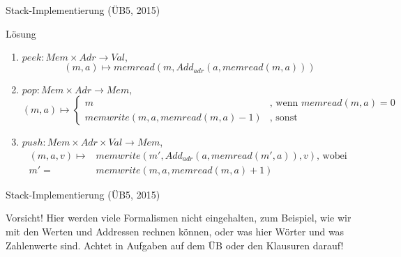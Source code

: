 \begin{frame}{Stack-Implementierung (ÜB5, 2015)}
	\begin{block}{Lösung}
		\begin{enumerate}
			\item $peek: Mem \times Adr \to Val,$ 
				\[(m,a) \mapsto memread(m, Add_{adr}(a, memread(m,a)))\]
			\item $pop: Mem \times Adr \to Mem,$
				\small{ \[(m,a) \mapsto \begin{cases}
					m & \text{, wenn } memread(m,a) = 0\\
					memwrite(m, a, memread(m,a)-1) & \text{, sonst}
				\end{cases}\]}
			\item $push: Mem \times Adr \times Val \to Mem$, \begin{align*}
						(m,a,v) \mapsto& memwrite(m', Add_{adr}(a, memread(m',a)), v) \text{, wobei } \\
						m' =& memwrite(m, a, memread(m,a)+1) 
					\end{align*}
				
		\end{enumerate}
	\end{block}
\end{frame}

\begin{frame}{Stack-Implementierung (ÜB5, 2015)}
	\begin{alertblock}{Vorsicht!}
		Hier werden viele Formalismen nicht eingehalten, zum Beispiel, wie wir mit den Werten und Addressen rechnen können, oder was hier Wörter und was Zahlenwerte sind. Achtet in Aufgaben auf dem ÜB oder den Klausuren darauf!
	\end{alertblock}
\end{frame}